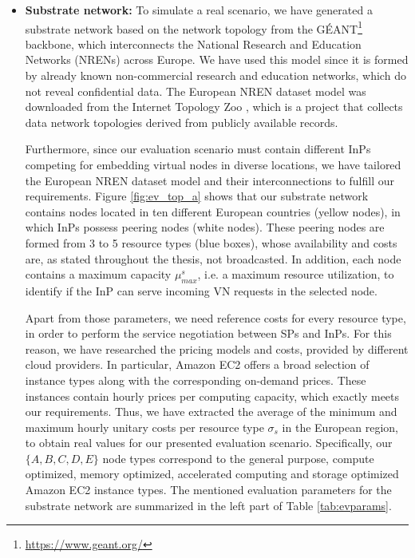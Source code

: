 \begin{itemize}
 \item \textbf{Substrate network:} To simulate a real scenario, we have generated a substrate network based on the network topology from the GÉANT\footnote{\url{https://www.geant.org/}} backbone, which interconnects the National Research and Education Networks (NRENs) across Europe. We have used this model since it is formed by already known non-commercial research and education networks, which do not reveal confidential data. The European NREN dataset model was downloaded from the Internet Topology Zoo \citep{zoo}, which is a project that collects data network topologies derived from publicly available records.

Furthermore, since our evaluation scenario must contain different InPs competing for embedding virtual nodes in diverse locations, we have tailored the European NREN dataset model and their interconnections to fulfill our requirements. Figure \ref{fig:ev_top_a} shows that our substrate network contains nodes located in ten different European countries (yellow nodes), in which InPs possess peering nodes (white nodes). These peering nodes are formed from 3 to 5 resource types (blue boxes), whose availability and costs are, as stated throughout the thesis, not broadcasted. In addition, each node contains a maximum capacity $\mu^{s}_{max}$, i.e. a maximum resource utilization, to identify if the InP can serve incoming VN requests in the selected node.

Apart from those parameters, we need reference costs for every resource type, in order to perform the service negotiation between SPs and InPs. For this reason, we have researched the pricing models and costs, provided by different cloud providers. In particular, Amazon EC2 \citep{amazonEC2} offers a broad selection of instance types along with the corresponding on-demand prices. These instances contain hourly prices per computing capacity, which exactly meets our requirements. Thus, we have extracted the average of the minimum and maximum hourly unitary costs per resource type $\sigma_s$ in the European region, to obtain real values for our presented evaluation scenario.  Specifically, our $\{A, B, C, D, E\}$ node types correspond to the general purpose, compute optimized, memory optimized, accelerated computing and storage optimized Amazon EC2 instance types. The mentioned evaluation parameters for the substrate network are summarized in the left part of Table \ref{tab:evparams}.


\end{itemize}
